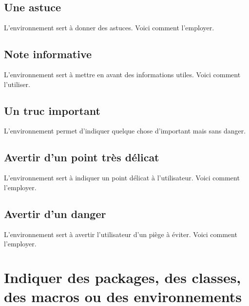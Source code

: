 

\subsection{Une astuce}

L'environnement  sert à donner des astuces. Voici comment l'employer.



\subsection{Note informative}

L'environnement  sert à mettre en avant des informations utiles. Voici comment l'utiliser.



\subsection{Un truc important}

L'environnement  permet d'indiquer quelque chose d'important mais sans danger.



\subsection{Avertir d'un point très délicat}

L'environnement  sert à indiquer un point délicat à  l'utilisateur. Voici comment l'employer.



\subsection{Avertir d'un danger}

L'environnement  sert à avertir l'utilisateur d'un piège à éviter. Voici comment l'employer.



\section{Indiquer des packages, des classes, des macros ou des environnements}

